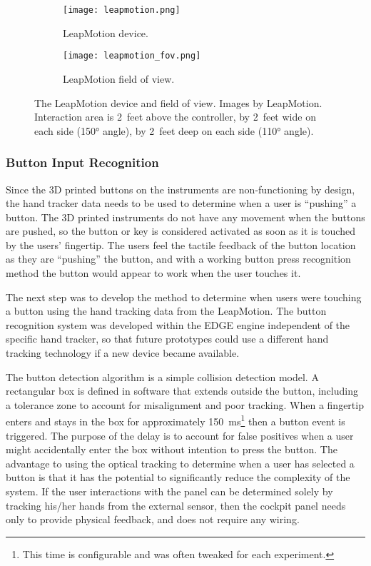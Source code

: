 \mbox{}\hfill
\begin{figure}
    \centering
    \begin{subfigure}[t]{0.49\linewidth}
        \centering
        \texttt{[image: leapmotion.png]}
        \caption{LeapMotion device.}
        \label{fig:proto_leap_device}
    \end{subfigure}\hfill
    \begin{subfigure}[t]{0.49\linewidth}
        \centering
        \texttt{[image: leapmotion\_fov.png]}
        \caption{LeapMotion field of view.}
        \label{fig:proto_leap_fov}
    \end{subfigure}
    \caption{The LeapMotion device and field of view. Images by LeapMotion. Interaction area is \num{2}~feet above the controller, by \num{2}~feet wide on each side (\ang{150} angle), by \num{2}~feet deep on each side (\ang{110} angle).}
    \label{fig:proto_leap}
\end{figure}
\hfill\mbox{}

\subsubsection{Button Input Recognition}
\label{sec:proto_button_input}

Since the 3D printed buttons on the instruments are non-functioning by design, the hand tracker data needs to be used to determine when a user is ``pushing'' a button.
The 3D printed instruments do not have any movement when the buttons are pushed, so the button or key is considered activated as soon as it is touched by the users' fingertip.
The users feel the tactile feedback of the button location as they are ``pushing'' the button, and with a working button press recognition method the button would appear to work when the user touches it.

The next step was to develop the method to determine when users were touching a button using the hand tracking data from the LeapMotion.
The button recognition system was developed within the EDGE engine independent of the specific hand tracker, so that future prototypes could use a different hand tracking technology if a new device became available.

The button detection algorithm is a simple collision detection model.
A rectangular box is defined in software that extends outside the button, including a tolerance zone to account for misalignment and poor tracking.
When a fingertip enters and stays in the box for approximately \SI{150}{\milli\second}\footnote{This time is configurable and was often tweaked for each experiment.} then a button event is triggered.
The purpose of the delay is to account for false positives when a user might accidentally enter the box without intention to press the button.
The advantage to using the optical tracking to determine when a user has selected a button is that it has the potential to significantly reduce the complexity of the system.
If the user interactions with the panel can be determined solely by tracking his/her hands from the external sensor, then the cockpit panel needs only to provide physical feedback, and does not require any wiring.

